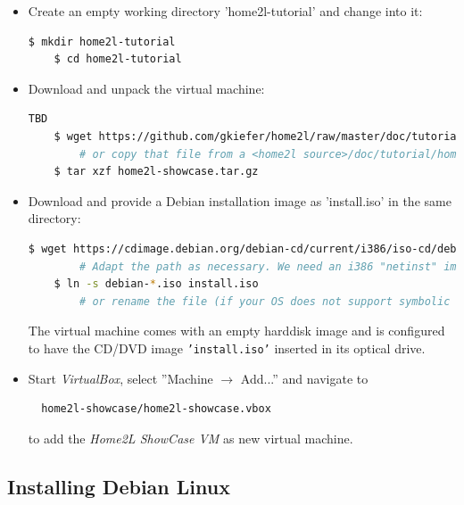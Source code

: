 \documentclass[12pt,english,parskip=half]{scrreprt}
\begin{document}
\begin{itemize}[$\blacktriangleright$]
\item
  Create an empty working directory 'home2l-tutorial' and change into it:

  \begin{lstlisting}[language=bash]
    $ mkdir home2l-tutorial
    $ cd home2l-tutorial
  \end{lstlisting}

\item
  Download and unpack the virtual machine:

  \begin{lstlisting}[language=bash]
    TBD
    $ wget https://github.com/gkiefer/home2l/raw/master/doc/tutorial/home2l-showcase.tar.gz
        # or copy that file from a <home2l source>/doc/tutorial/home2l-showcase.tar.gz
    $ tar xzf home2l-showcase.tar.gz
  \end{lstlisting}

\item
  Download and provide a Debian installation image as 'install.iso' in the same directory:

  \begin{lstlisting}[language=bash]
    $ wget https://cdimage.debian.org/debian-cd/current/i386/iso-cd/debian-9.6.0-i386-netinst.iso
        # Adapt the path as necessary. We need an i386 "netinst" image.
    $ ln -s debian-*.iso install.iso
        # or rename the file (if your OS does not support symbolic links)
  \end{lstlisting}

  The virtual machine comes with an empty harddisk image and is configured
  to have the CD/DVD image \texttt{'install.iso'} inserted in its optical drive.

\item
  Start \textit{VirtualBox}, select ''Machine $\rightarrow$ Add...''
  and navigate to
  \begin{lstlisting}
  home2l-showcase/home2l-showcase.vbox
  \end{lstlisting}
  to add the \textit{Home2L ShowCase VM} as new virtual machine.
\end{itemize}



\subsection{Installing Debian Linux}
\label{sec:tutorial-vm-debian}
\end{document}
